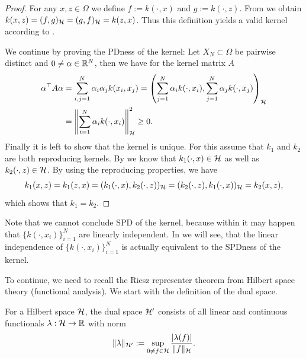 \begin{proof}
For any $x, z \in \Omega$ we define $f := k(\cdot, x)$ and $g := k(\cdot, z)$.
From  we obtain $k(x, z) = (f, g)_{\mathcal{H}} = (g, f)_{\mathcal{H}} = k(z, x)$.
Thus this definition yields a valid kernel according to .

We continue by proving the PDness of the kernel:
Let $X_N \subset \Omega$ be pairwise distinct and $0 \neq \alpha \in \mathbb{R}^N$, then we have for the kernel matrix $A$
\begin{align}
\label{eq:proof_calc_1}
\begin{aligned}
\alpha^\top A \alpha &= \sum_{i,j=1}^N \alpha_i \alpha_j k(x_i, x_j) = \left( \sum_{j=1}^N \alpha_i k(\cdot, x_i), \sum_{j=1}^N \alpha_j k(\cdot, x_j) \right)_{\mathcal{H}} \\
&= \left \Vert \sum_{i=1}^N \alpha_i k(\cdot, x_i) \right \Vert_{\mathcal{H}}^2 \geq 0.
\end{aligned}
\end{align}
Finally it is left to show that the kernel is unique.
For this assume that $k_1$ and $k_2$ are both reproducing kernels. 
By  we know that $k_1(\cdot, x) \in \mathcal{H}$ as well as $k_2(\cdot, z) \in \mathcal{H}$.
By using the reproducing properties, we have
\begin{align*}
k_1(x, z) = k_1(z, x) = (k_1(\cdot, x), k_2(\cdot, z))_{\mathcal{H}} = (k_2(\cdot, z), k_1(\cdot, x))_{\mathcal{H}} = k_2(x, z),
\end{align*}
which shows that $k_1 = k_2$.
\end{proof}


Note that we cannot conclude SPD of the kernel, because within  it may happen that $\{ k(\cdot, x_i) \}_{i=1}^N$ are linearly independent.
In  we will see, 
that the linear independence of $\{ k(\cdot, x_i) \}_{i=1}^N$ is actually equivalent to the SPDness of the kernel.


To continue, we need to recall the Riesz representer theorem from Hilbert space theory (functional analysis).
We start with the definition of the dual space.

\begin{definition}
For a Hilbert space $\mathcal{H}$, the dual space $\mathcal{H}'$ consists of all linear and continuous functionals $\lambda: \mathcal{H} \rightarrow \mathbb{R}$ with norm
\begin{align*}
\Vert \lambda \Vert_{\mathcal{H}'} := \sup_{0 \neq f \in \mathcal{H}} \frac{|\lambda(f)|}{\Vert f \Vert_{\mathcal{H}}}.
\end{align*}
\end{definition}

